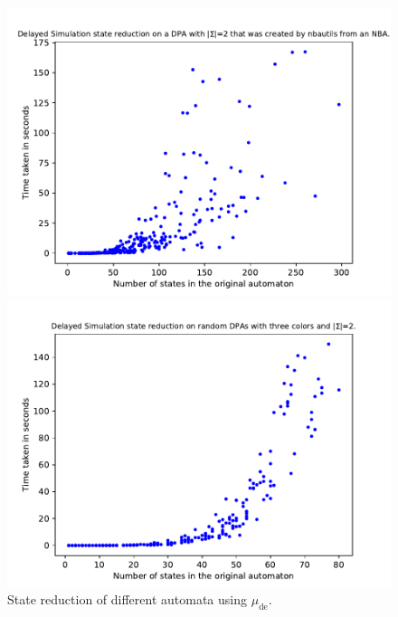 \begin{figure}
\begin{minipage}{0.49\textwidth}
		\includegraphics[page=6,height=.3\textheight]{../data/analysis/fritzwilke/detnbaut_ap1.pdf} 
		\caption{State reduction of different automata using $\mu_\text{de}$.}
		\label{fig:fritzwilke:empirical_size_hist}
	\end{minipage}
	\hfill
	\begin{minipage}{0.49\textwidth}
		\includegraphics[page=3,height=.3\textheight]{../data/analysis/fritzwilke/gendet_ap1.pdf} 

\end{minipage}
\end{figure}
